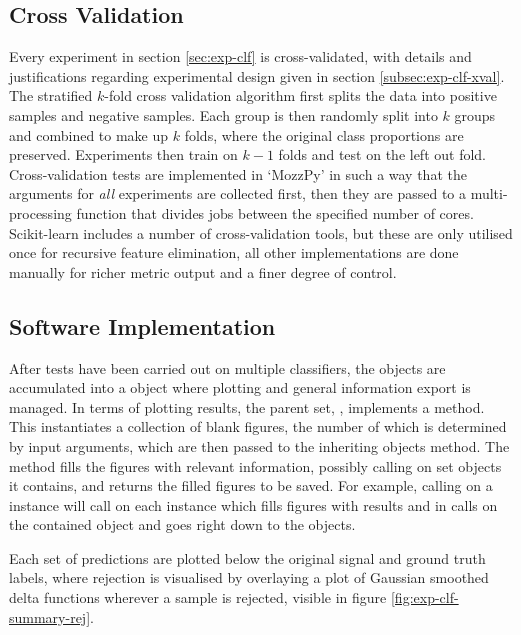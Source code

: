    \subsection{Cross Validation}
    \label{subsec:pl-test-xval}
        Every experiment in section \ref{sec:exp-clf} is cross-validated, with details and justifications regarding experimental design given in section \ref{subsec:exp-clf-xval}. The stratified $k$-fold cross validation algorithm first splits the data into positive samples and negative samples. Each group is then randomly split into $k$ groups and combined to make up $k$ folds, where the original class proportions are preserved. Experiments then train on $k-1$ folds and test on the left out fold. Cross-validation tests are implemented in `MozzPy' in such a way that the arguments for \textit{all} experiments are collected first, then they are passed to a multi-processing function that divides jobs between the specified number of cores. Scikit-learn includes a number of cross-validation tools, but these are only utilised once for recursive feature elimination, all other implementations are done manually for richer metric output and a finer degree of control.
        
    \subsection{Software Implementation}
    \label{subsec:pl-test-software}
        After tests have been carried out on multiple classifiers, the  objects are accumulated into a  object where plotting and general information export is managed. In terms of plotting results, the parent set, , implements a  method. This instantiates a collection of blank figures, the number of which is determined by input arguments, which are then passed to the inheriting objects  method. The  method fills the figures with relevant information, possibly calling  on set objects it contains, and returns the filled figures to be saved. For example, calling  on a  instance will call  on each  instance which fills figures with results and in calls  on the contained  object and goes right down to the  objects.
        
        Each set of predictions are plotted below the original signal and ground truth labels, where rejection is visualised by overlaying a plot of Gaussian smoothed delta functions wherever a sample is rejected, visible in figure \ref{fig:exp-clf-summary-rej}.
